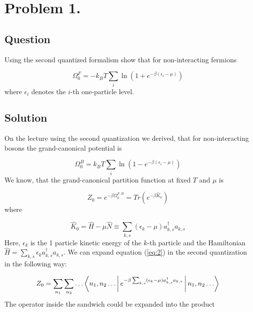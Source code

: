 \section*{Problem 1.}
\subsection*{Question}
Using the second quantized formalism show that for non-interacting fermions

\begin{equation*}
\Omega_{0}^{F}
=
- k_{B} T \sum_{i} \ln \left( 1 + e^{-\beta \left( \epsilon_{i} - \mu \right)} \right)
\end{equation*}
where $\epsilon_{i}$ denotes the $i$-th one-particle level.

\subsection*{Solution}
On the lecture using the second quantization we derived, that for non-interacting bosons the grand-canonical potential is

\begin{equation} \label{eq:1}
\Omega_{0}^{B}
=
k_{B} T \sum_{i} \ln \left( 1 - e^{-\beta \left( \epsilon_{i} - \mu \right)} \right)
\end{equation}
We know, that the grand-canonical partition function at fixed $T$ and $\mu$ is

\begin{equation} \label{eq:2}
Z_{0}
=
e^{-\beta \Omega_{0}^{F,B}}
=
Tr \left( e^{-\beta \hat{K}_{0}} \right)
\end{equation}
where

\begin{equation} \label{eq:3}
\hat{K}_{0}
=
\hat{H} - \mu \hat{N}
\equiv
\sum_{k,s} \left( \epsilon_{k} - \mu \right) a_{k,s}^{\dagger} a_{k,s}
\end{equation}
Here, $\epsilon_{k}$ is the 1 particle kinetic energy of the $k$-th particle and the Hamiltonian $\hat{H} = \sum_{k,s} \epsilon_{k} a_{k,s}^{\dagger} a_{k,s}$. We can expand equation (\ref{eq:2}) in the second quantization in the following way:

\begin{equation} \label{eq:4}
Z_{0}
=
\sum_{n_{1}} \sum_{n_{2}} \dots
\Braket{n_{1}, n_{2} \dots|e^{-\beta \sum_{k,s} \left( \epsilon_{k} - \mu \right) a_{k,s}^{\dagger} a_{k,s}}|n_{1}, n_{2} \dots}
\end{equation}
The operator inside the sandwich could be expanded into the product

